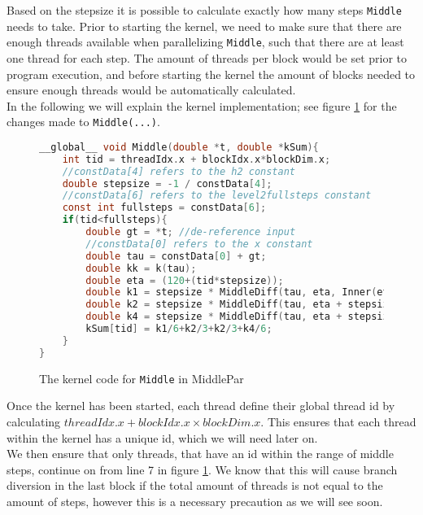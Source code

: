 Based on the stepsize it is possible to calculate exactly how many steps \texttt{Middle} needs to take. Prior to starting the kernel, we need to make sure that there are enough threads available when parallelizing \texttt{Middle}, such that there are at least one thread for each step. The amount of threads per block would be set prior to program execution, and before starting the kernel the amount of blocks needed to ensure enough threads would be automatically calculated.\\

In the following we will explain the kernel implementation; see figure \ref{fig:middlepar} for the changes made to \texttt{Middle(...)}.\\
\begin{figure}[H]
\begin{lstlisting}[language=c]
__global__ void Middle(double *t, double *kSum){
	int tid = threadIdx.x + blockIdx.x*blockDim.x;
	//constData[4] refers to the h2 constant
	double stepsize = -1 / constData[4]; 
	//constData[6] refers to the level2fullsteps constant
	const int fullsteps = constData[6]; 
	if(tid<fullsteps){
		double gt = *t; //de-reference input
		//constData[0] refers to the x constant
		double tau = constData[0] + gt; 
		double kk = k(tau);
		double eta = (120+(tid*stepsize));
		double k1 = stepsize * MiddleDiff(tau, eta, Inner(eta, gt, kk).y);
		double k2 = stepsize * MiddleDiff(tau, eta + stepsize/2, Inner(eta + stepsize/2, gt, kk).y);		
		double k4 = stepsize * MiddleDiff(tau, eta + stepsize, Inner(eta + stepsize, gt, kk).y);
		kSum[tid] = k1/6+k2/3+k2/3+k4/6;
	}
}
\end{lstlisting}
\caption{The kernel code for \texttt{Middle} in MiddlePar}
\label{fig:middlepar}
\end{figure}

Once the kernel has been started, each thread define their global thread id by calculating $threadIdx.x + blockIdx.x \times blockDim.x$. This ensures that each thread within the kernel has a unique id, which we will need later on.\\

We then ensure that only threads, that have an id within the range of middle steps, continue on from line 7 in figure \ref{fig:middlepar}. We know that this will cause branch diversion in the last block if the total amount of threads is not equal to the amount of steps, however this is a necessary precaution as we will see soon.\\

